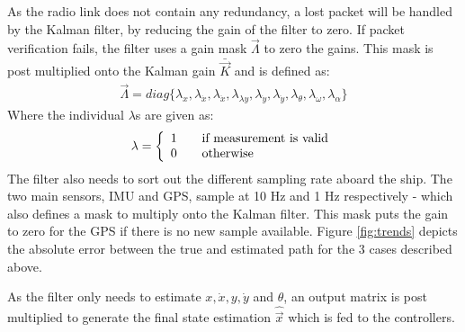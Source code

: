 \documentclass[a0,portrait]{a0poster}
\begin{document}
\begin{center}
{As the radio link does not contain any redundancy, a lost packet will be handled by the Kalman filter, by reducing the gain of the filter to zero. If packet verification fails, the filter uses a gain mask $\vec{\Lambda}$ to zero the gains. This mask is post multiplied onto the Kalman gain $\bar{\vec{K}}$ and is defined as:
\begin{align}
\vec{\Lambda} = diag\{\lambda_x,\lambda_{\dot{x}},\lambda_{\ddot{x}},\lambda_{\lambda{y}},\lambda_{\dot{y}},\lambda_{\ddot{y}},\lambda_{\theta},\lambda_{\omega},\lambda_{\alpha} \}
\end{align}
Where the individual $\lambda$s are given as:
\begin{align}
\lambda = 
\left\{
  \begin{array}{l l}
    1 & \quad \text{if measurement is valid}\\
    0 & \quad \text{otherwise}
  \end{array} \right.
\end{align} 
The filter also needs to sort out the different sampling rate aboard the ship. The two main sensors, IMU and GPS, sample at 10 Hz and 1 Hz respectively - which also defines a mask to multiply onto the Kalman filter. This mask puts the gain to zero for the GPS if there is no new sample available. Figure \ref{fig:trends} depicts the absolute error between the true and estimated path for the 3 cases described above.

As the filter only needs to estimate $x,\dot{x},y,\dot{y}$ and $\theta$, an output matrix is post multiplied to generate the final state estimation $\hat{\vec{x}}$ which is fed to the controllers. 

}
\col{
}
\end{center}
\end{document}
